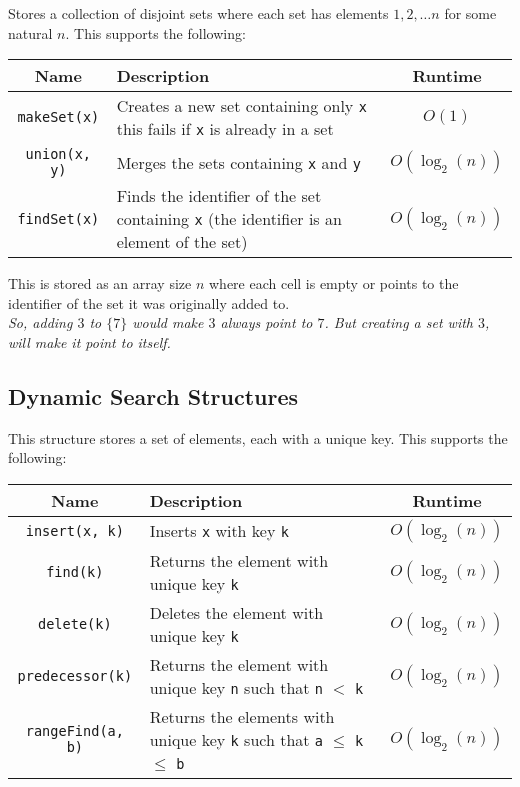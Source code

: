 \documentclass[a4paper, 12pt, twoside]{article}
\begin{document}
Stores a collection of disjoint sets where each set has elements
$1, 2, \ldots n$ for some natural $n$. This supports the following:
\begin{center}
  \begin{tabular}{ || c | p{7.5cm} | c || }
    \hline
    Name & Description & Runtime \\
    \hline
    \texttt{makeSet(x)} & Creates a new set containing only \texttt{x}
    this fails if \texttt{x} is already in a set
    & $O(1)$ \\
    \hline
    \texttt{union(x, y)} & Merges the sets containing 
    \texttt{x} and \texttt{y}
    & $O(\log_2(n))$ \\
    \hline
    \texttt{findSet(x)} & Finds the identifier of the set containing
    \texttt{x} (the identifier is an element of the set)
    & $O(\log_2(n))$ \\
    \hline
  \end{tabular}
\end{center} This is stored as an array size $n$ where each cell
is empty or points to the identifier of the set it was originally
added to.
\\[\baselineskip]
\textit{So, adding $3$ to $\{7\}$ would make $3$ always point to 
$7$. But creating a set with $3$, will make it point to itself.}

\subsection{Dynamic Search Structures}

This structure stores a set of elements, each with a unique key.
This supports the following:
\begin{center}
  \begin{tabular}{ || c | p{7.5cm} | c || }
    \hline
    Name & Description & Runtime \\
    \hline
    \texttt{insert(x, k)} & Inserts \texttt{x}
    with key \texttt{k}
    & $O(\log_2(n))$ \\
    \hline
    \texttt{find(k)} & Returns the element with 
    unique key \texttt{k}
    & $O(\log_2(n))$ \\
    \hline
    \texttt{delete(k)} & Deletes the element with unique key
    \texttt{k}
    & $O(\log_2(n))$ \\
    \hline
    \texttt{predecessor(k)} & Returns the element with unique key
    \texttt{n} such that \texttt{n} $<$ \texttt{k}
    & $O(\log_2(n))$ \\
    \hline
    \texttt{rangeFind(a, b)} & Returns the elements with unique key
    \texttt{k} such that \texttt{a} $\leq$ \texttt{k} $\leq$ \texttt{b}
    & $O(\log_2(n))$ \\
    \hline
  \end{tabular}
\end{center}
\end{document}
